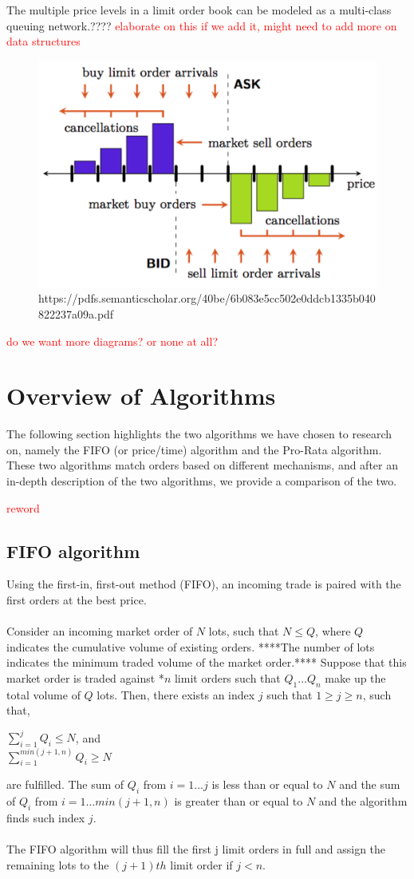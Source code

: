 \documentclass{article}
\newcommand{\todo}{\textcolor{red}}
\begin{document}
The multiple price levels in a limit order book can be modeled as a multi-class queuing network.???? \todo{elaborate on this if we add it, might need to add more on data structures} \\
	\begin{figure}[h]
		\centering
		\includegraphics[width=0.5\linewidth]{chart.png}
		\caption{https://pdfs.semanticscholar.org/40be/6b083e5cc502e0ddcb1335b040822237a09a.pdf}
		\label{fig}
	\end{figure}

\todo{do we want more diagrams? or none at all?}

\section{Overview of Algorithms}
The following section highlights the two algorithms we have chosen to research on, namely the FIFO (or price/time) algorithm and the Pro-Rata algorithm. These two algorithms match orders based on different mechanisms, and after an in-depth description of the two algorithms, we provide a comparison of the two.

\todo{reword}

\subsection{FIFO algorithm}
Using the first-in, first-out method (FIFO), an incoming trade is paired with the first orders at the best price.\\\\
Consider an incoming market order of $N$ lots, such that $N\leq Q$, where $Q$ indicates the cumulative volume of existing orders. ****The number of lots indicates the minimum traded volume of the market order.**** Suppose that this market order is traded against *$n$ limit orders such that $Q_1... Q_n$ make up the total volume of $Q$ lots. Then, there exists an index $j$ such that $1\geq j \geq n$, such that,
\begin{center}
    $\sum_{i=1}^j Q_i \leq N$, and\\
    $\sum_{i=1}^{min(j+1, n)} Q_i \geq N$
\end{center}
are fulfilled. The sum of $Q_i$ from $i = 1 \ldots j$ is less than or equal to $N$ and the sum of $Q_i$ from $i = 1\ldots min(j+1, n)$ is greater than or equal to $N$ and the algorithm finds such index $j$.\\\\
The FIFO algorithm will thus fill the first j limit orders in full and assign the remaining lots to the $(j + 1)th$ limit order if $j < n$.
\end{document}
